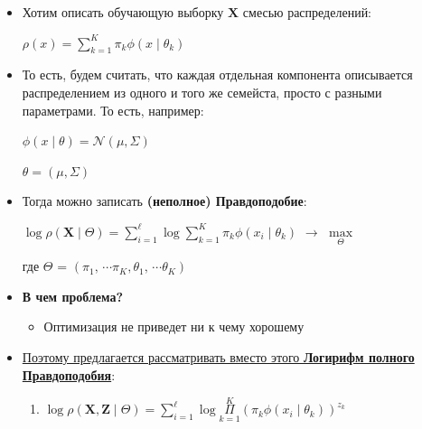             \begin{itemize}
                \item Хотим описать обучающую выборку $\mathbf{X}$ смесью распределений:
                \begin{center}
                    \large
                    $\rho(x) = \sum\limits_{k = 1}^K \pi_k \phi(x \mid \theta_k)$
                \end{center}

                \item То есть, будем считать, что каждая отдельная компонента описывается распределением из одного и того же семейста, просто с разными параметрами. То есть, например:
                \begin{center}
                    \large
                    $\phi(x \mid \theta) = \mathcal{N}(\mu, \Sigma)$
                \end{center}

                \begin{center}
                \large
                    $\theta  = (\mu, \Sigma)$
                \end{center}

                \item Тогда можно записать \textbf{(неполное) Правдоподобие}:
                \begin{center}
                \Large
                    $\log \rho(\mathbf{X} \mid \Theta) = \sum\limits_{i = 1}^\ell \log \sum\limits_{k = 1}^K \pi_k \phi(x_i \mid \theta_k)$ $\longrightarrow$ $\max\limits_{\Theta}$
                \end{center}
                где $\Theta$ = $(\pi_1, \, \cdots \pi_K, \theta_1, \, \cdots \theta_K)$

                \item \textbf{В чем проблема?}
                \begin{itemize}
                    \item Оптимизация не приведет ни к чему хорошему
                \end{itemize}

                \item \underline{Поэтому предлагается рассматривать вместо этого \textbf{Логирифм полного Правдоподобия}}:
                \begin{enumerate}
                    \item \begin{center}
                        \large
                        $\log \rho(\mathbf{X}, \mathbf{Z} \mid \Theta) = \sum\limits_{i = 1}^\ell \log \Pi\limits_{k = 1}^K(\pi_k \phi(x_i \mid \theta_k))^{z_k}$ 
                    \end{center}


\end{enumerate}
\end{itemize}
